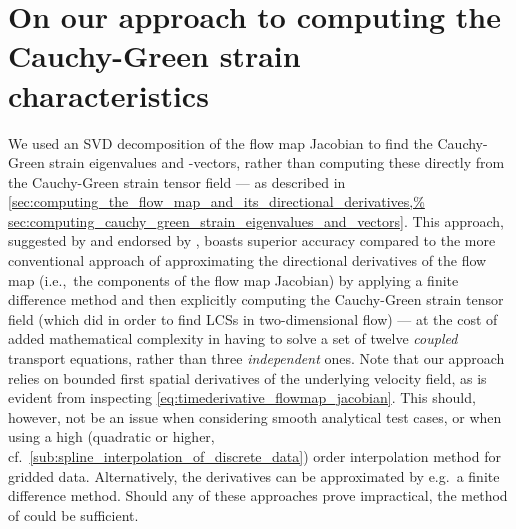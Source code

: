 \section[On our approach to computing the Cauchy-Green
strain characteristics] {On our approach to computing the%
    \\\phantom{5.1} Cauchy-Green strain characteristics}
\label{sec:on_our_approach_to_computing_the_cauchy_green%
_strain_characteristics}

We used an SVD decomposition of the flow map Jacobian to find the Cauchy-Green
strain eigenvalues and -vectors, rather than computing these directly from the
Cauchy-Green strain tensor field --- as described in
\cref{sec:computing_the_flow_map_and_its_directional_derivatives,%
sec:computing_cauchy_green_strain_eigenvalues_and_vectors}. This approach,
suggested by \textcite{miron2012anisotropic} and endorsed by
\textcite{oettinger2016autonomous}, boasts superior accuracy compared to the
more conventional approach of approximating the directional derivatives of the
flow map (i.e.,\ the components of the flow map Jacobian) by applying a finite
difference method and then explicitly computing the Cauchy-Green strain
tensor field (which \textcite{farazmand2012computing} did in order to find LCSs
in two-dimensional flow) --- at the cost of added mathematical complexity in
having to solve a set of twelve \emph{coupled} transport equations, rather than
three \emph{independent} ones.
Note that our approach relies on bounded
first spatial derivatives of the underlying velocity field, as is evident from
inspecting \cref{eq:timederivative_flowmap_jacobian}. This should, however, not
be an issue when considering smooth analytical test cases, or when using a high
(quadratic or higher, cf.\ \cref{sub:spline_interpolation_of_discrete_data})
order interpolation method for gridded data. Alternatively, the derivatives can
be approximated by e.g.\ a finite difference method. Should any of these
approaches prove impractical, the method of \textcite{farazmand2012computing}
could be sufficient.

